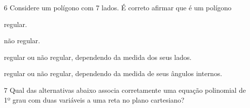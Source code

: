 




\num{6} Considere um polígono com 7 lados. É correto afirmar que é um polígono

\begin{escolha}
\item regular.
\item não regular.
\item regular ou não regular, dependendo da medida dos seus
lados.
\item regular ou não regular, dependendo da medida de seus
ângulos internos.
\end{escolha}







\num{7} Qual das alternativas abaixo associa corretamente uma equação
polinomial de 1º grau com duas variáveis a uma reta no plano cartesiano?

